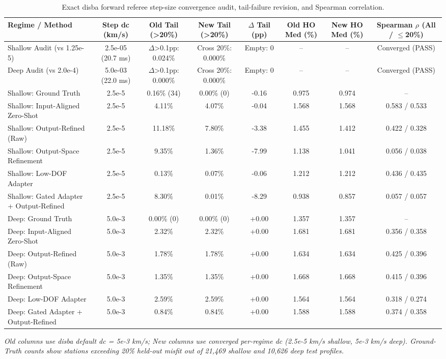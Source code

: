 \begin{table}[t]
\centering
\scriptsize
\caption{Exact disba forward referee step-size convergence audit, tail-failure revision, and Spearman correlation.}
\label{tab:referee_convergence}
\begin{tabular}{lccccccc}
\toprule
Regime / Method & Step dc (km/s) & Old Tail (>20\%) & New Tail (>20\%) & $\Delta$ Tail (pp) & Old HO Med (\%) & New HO Med (\%) & Spearman $\rho$ (All / $\le$20\%) \\
\midrule
Shallow Audit (vs 1.25e-5) & 2.5e-05 (20.7 ms) & $\Delta$>0.1pp: 0.024\% & Cross 20\%: 0.000\% & Empty: 0 & -- & -- & Converged (PASS) \\
Deep Audit (vs 2.0e-4) & 5.0e-03 (22.0 ms) & $\Delta$>0.1pp: 0.000\% & Cross 20\%: 0.000\% & Empty: 0 & -- & -- & Converged (PASS) \\
Shallow: Ground Truth & 2.5e-5 & 0.16\% (34) & 0.00\% (0) & -0.16 & 0.975 & 0.974 & -- \\
Shallow: Input-Aligned Zero-Shot & 2.5e-5 & 4.11\% & 4.07\% & -0.04 & 1.568 & 1.568 & 0.583 / 0.533 \\
Shallow: Output-Refined (Raw) & 2.5e-5 & 11.18\% & 7.80\% & -3.38 & 1.455 & 1.412 & 0.422 / 0.328 \\
Shallow: Output-Space Refinement & 2.5e-5 & 9.35\% & 1.36\% & -7.99 & 1.138 & 1.041 & 0.056 / 0.038 \\
Shallow: Low-DOF Adapter & 2.5e-5 & 0.13\% & 0.07\% & -0.06 & 1.212 & 1.212 & 0.436 / 0.435 \\
Shallow: Gated Adapter + Output-Refined & 2.5e-5 & 8.30\% & 0.01\% & -8.29 & 0.938 & 0.857 & 0.057 / 0.057 \\
Deep: Ground Truth & 5.0e-3 & 0.00\% (0) & 0.00\% (0) & +0.00 & 1.357 & 1.357 & -- \\
Deep: Input-Aligned Zero-Shot & 5.0e-3 & 2.32\% & 2.32\% & +0.00 & 1.681 & 1.681 & 0.356 / 0.358 \\
Deep: Output-Refined (Raw) & 5.0e-3 & 1.78\% & 1.78\% & +0.00 & 1.634 & 1.634 & 0.425 / 0.396 \\
Deep: Output-Space Refinement & 5.0e-3 & 1.35\% & 1.35\% & +0.00 & 1.668 & 1.668 & 0.415 / 0.396 \\
Deep: Low-DOF Adapter & 5.0e-3 & 2.59\% & 2.59\% & +0.00 & 1.564 & 1.564 & 0.318 / 0.274 \\
Deep: Gated Adapter + Output-Refined & 5.0e-3 & 0.84\% & 0.84\% & +0.00 & 1.588 & 1.588 & 0.374 / 0.358 \\
\bottomrule
\end{tabular}
\par\vspace{2pt}\noindent\footnotesize{\textit{Old columns use disba default dc = 5e-3 km/s; New columns use converged per-regime dc (2.5e-5 km/s shallow, 5e-3 km/s deep). Ground-Truth counts show stations exceeding 20\% held-out misfit out of 21,469 shallow and 10,626 deep test profiles.}}
\end{table}
